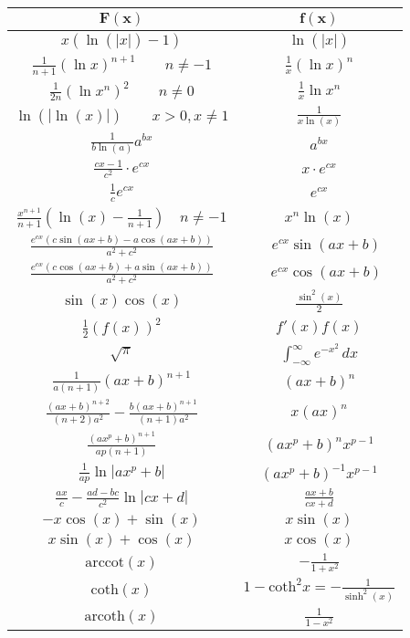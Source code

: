 \begin{center}
\begin{tabular}{c|c}
    $\mathbf{F(x)}$ & $\mathbf{f(x)}$ \\
    \midrule
    $x  (\ln(|x|) - 1)$ & $\ln(|x|)$ \\
    $\frac{1}{n+1} (\ln x)^{n+1} \quad \quad n \neq -1 $ & $ \frac{1}{x}(\ln x)^n$ \\
    $\frac{1}{2n} (\ln x^n)^{2} \quad \quad n \neq 0 $ & $ \frac{1}{x}\ln x^n$ \\
    $\ln(|\ln(x)|) \quad \quad x > 0, x \neq 1$ & $\frac{1}{x \ln(x)}$ \\
    $\frac{1}{b \ln(a)} a^{bx}$ & $a^{bx}$ \\
    $\frac{cx - 1}{c^2} \cdot e^{cx}$ & $x \cdot e^{cx}$ \\
    $\frac{1}{c}e^{cx}$ & $e^{cx}$ \\
    $\frac{x^{n + 1}}{n + 1} \left(\ln(x) - \frac{1}{n + 1}\right) \quad n \neq -1 $ & $x^n \ln(x)$ \\
    $\frac{e^{cx} \left(c \sin(ax + b) - a \cos(ax + b) \right)}{a^2 + c^2}$ & $\quad e^{cx} \sin (ax + b) $ \\
    $\frac{e^{cx} \left(c \cos (ax + b) + a \sin(ax + b) \right)}{a^2 + c^2}$ & $\quad e^{cx} \cos (ax+b)$ \\
    $\sin(x)\cos(x)$ & $\frac{\sin^2(x)}{2}$ \\
    $\frac{1}{2}(f(x))^2$ & $f'(x) f(x)$ \\
    $\sqrt{\pi}$ & $\int_{-\infty}^\infty e^{-x^2} \,dx$ \\
    $\frac{1}{a(n+1)}(ax+b)^{n+1}$ & $(ax+b)^n$ \\
    $\frac{(ax+b)^{n+2}}{(n+2)a^2} - \frac{b(ax+b)^{n+1}}{(n+1)a^2}$ & $x(ax)^n$ \\
    $\frac{(ax^p+b)^{n+1}}{ap(n+1)}$ & $(ax^p+b)^n x^{p-1}$ \\
    $\frac{1}{ap} \ln |ax^p + b|$ & $(ax^p + b)^{-1} x^{p-1}$ \\
    $\frac{ax}{c} - \frac{ad-bc}{c^2} \ln |cx +d|$ & $\frac{ax+b}{cx+d}$ \\
    $- x \cos (x) + \sin(x)$ & $x \sin (x)$ \\
    $x \sin(x) + \cos (x)$ & $x \cos (x)$ \\
    $\text{arccot}(x)$ & $- \frac{1}{1 + x^2}$ \\
    $\text{coth}(x)$ & $1 - \text{coth}^2 x = - \frac{1}{\sinh^2(x)}$ \\
    $\text{arcoth}(x)$ & $\frac{1}{1 - x^2}$ \\
\end{tabular}
\end{center}
